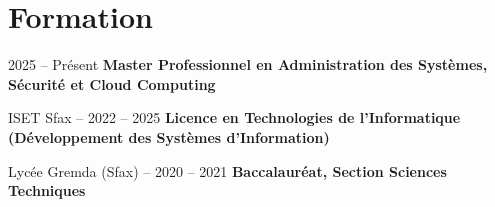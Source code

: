 \section{Formation}

    \vspace{0.2em}
    \begin{twocolentry}{
            2025 -- Présent
        }
            \textbf{Master Professionnel en Administration des Systèmes, Sécurité et Cloud Computing} 
    \end{twocolentry}

    \vspace{0.2em}
    \begin{twocolentry}{
            ISET Sfax -- 2022 -- 2025
        }
            \textbf{Licence en Technologies de l'Informatique (Développement des Systèmes d'Information)}
    \end{twocolentry}

    \vspace{0.2em}
    \begin{twocolentryforright}{
            Lycée Gremda (Sfax) -- 2020 -- 2021
        }
            \textbf{Baccalauréat, Section Sciences Techniques}
    \end{twocolentryforright}
